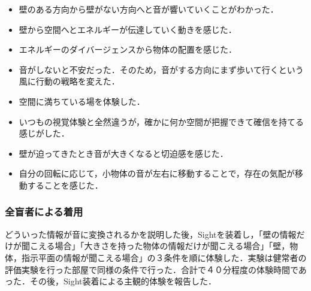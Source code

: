 \begin{itemize}
\item 壁のある方向から壁がない方向へと音が響いていくことがわかった．
\item 壁から空間へとエネルギーが伝達していく動きを感じた．
\item エネルギーのダイバージェンスから物体の配置を感じた．
\item 音がしないと不安だった．そのため，音がする方向にまず歩いて行くという風に行動の戦略を変えた．
\item 空間に満ちている場を体験した．
\item いつもの視覚体験と全然違うが，確かに何か空間が把握できて確信を持てる感じがした．
\item 壁が迫ってきたとき音が大きくなると切迫感を感じた．
\item 自分の回転に応じて，小物体の音が左右に移動することで，存在の気配が移動することを感じた．
\end{itemize}
\subsubsection{全盲者による着用}
どういった情報が音に変換されるかを説明した後，Sightを装着し，「壁の情報だけが聞こえる場合」「大きさを持った物体の情報だけが聞こえる場合」「壁，物体，指示平面の情報が聞こえる場合」の３条件を順に体験した．実験は健常者の評価実験を行った部屋で同様の条件で行った．合計で４０分程度の体験時間であった．その後，Sight装着による主観的体験を報告した．

